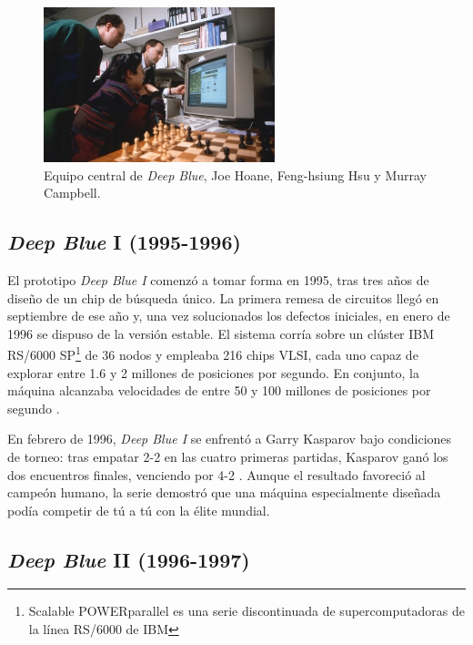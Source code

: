 \documentclass[a4paper, 12pt]{article}
\begin{document}
\begin{figure}[h]
    \centering
    \includegraphics[width=0.6\textwidth]{assets/Deep Blue's core team, Joe Hoane, Feng-hsiung Hsu, and Murray Campbell.jpg}
    \caption{Equipo central de \textit{Deep Blue}, Joe Hoane, Feng-hsiung Hsu y Murray Campbell.}
    \label{fig:team}
\end{figure}


\subsection{\textit{Deep Blue} I (1995-1996)}

El prototipo \textit{Deep Blue I} comenzó a tomar forma en 1995, 
tras tres años de diseño de un chip de búsqueda único. La 
primera remesa de circuitos llegó en septiembre de ese año y, 
una vez solucionados los defectos iniciales, en enero de 1996 se 
dispuso de la versión estable. El sistema corría sobre un 
clúster IBM RS/6000 SP\footnote{Scalable POWERparallel es una serie discontinuada de supercomputadoras de la línea RS/6000 de IBM} 
de 36 nodos y empleaba 216 chips VLSI, 
cada uno capaz de explorar entre 1.6 y 2 millones de posiciones 
por segundo. En conjunto, la máquina alcanzaba velocidades de 
entre 50 y 100 millones de posiciones por segundo \cite{campbell2002deep}.    

En febrero de 1996, \textit{Deep Blue I} se enfrentó a Garry 
Kasparov bajo condiciones de torneo: tras empatar 2-2 en las 
cuatro primeras partidas, Kasparov ganó los dos encuentros 
finales, venciendo por 4-2 \cite{campbell2002deep}. Aunque el 
resultado favoreció al campeón humano, la serie demostró que una 
máquina especialmente diseñada podía competir de tú a tú con la 
élite mundial.

\subsection{\textit{Deep Blue} II (1996-1997)}
\end{document}
